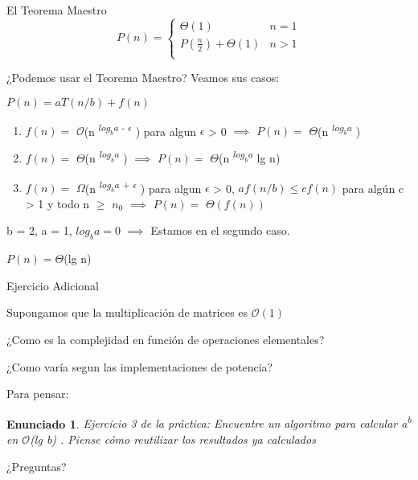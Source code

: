 \documentclass[pdf]{beamer}
\newtheorem{enun}{Enunciado}
\begin{document}
\begin{frame}{El Teorema Maestro}
\[ P(n) =  \begin{cases} 
    \Theta(1) & n = 1 \\
    P(\frac{n}{2}) + \Theta(1) & n > 1 \\ 
   \end{cases}
 \]
 
 ¿Podemos usar el Teorema Maestro? Veamos sus casos:
 
 \pause
 
 \vspace{0.5em}
 
 \par{$P(n) = aT(n/b) + f(n)$}
 
 \vspace{0.5em}
 
 \begin{enumerate}
    \item $f(n) = $  $\mathcal{O}$(n \textsuperscript{$log_b{a} $ - \(\epsilon\)  })  para algun \(\epsilon\) > 0 $\implies$ $P(n) =$ $\Theta$(n \textsuperscript{$log_b{a} $ })
    \item $f(n) = $  $\Theta$(n \textsuperscript{$log_b{a} $ }) $\implies$ $P(n) =$ $\Theta$(n \textsuperscript{$log_b{a} $ } lg n)
    \item $f(n) = $  $\Omega$(n \textsuperscript{$log_b{a} $ + \(\epsilon\) }) para algun \(\epsilon\) > 0, $a f(n/b) \leq c f(n)$ para algún c > 1 y todo n $\geq$ $n_0$ 
    $\implies$ $P(n) =$ $\Theta(f(n))$
 \end{enumerate}

\pause
\par{b = 2, a = 1, $log_b{a} = 0$ $\implies$ Estamos en el segundo caso. }
\par{$P(n) = \Theta$(lg n)}   

\end{frame}

\begin{frame}{Ejercicio Adicional}
    \par{Supongamos que la multiplicación de matrices es $\mathcal{O}(1)$}
    \par{¿Como es la complejidad en función de operaciones elementales?}
    
    \pause
    \vspace{1em}
    ¿Como varía segun las implementaciones de potencia?
    
    \pause
    \vspace{1em}
    Para pensar:
    
    \begin{enun}
	Ejercicio 3 de la práctica:
	Encuentre un algoritmo para calcular a\textsuperscript{b} en $\mathcal{O}$(lg b) . Piense cómo reutilizar los resultados
	ya calculados
	
    \end{enun}
    
\end{frame}

\begin{frame}
    ¿Preguntas?
\end{frame}
\end{document}
